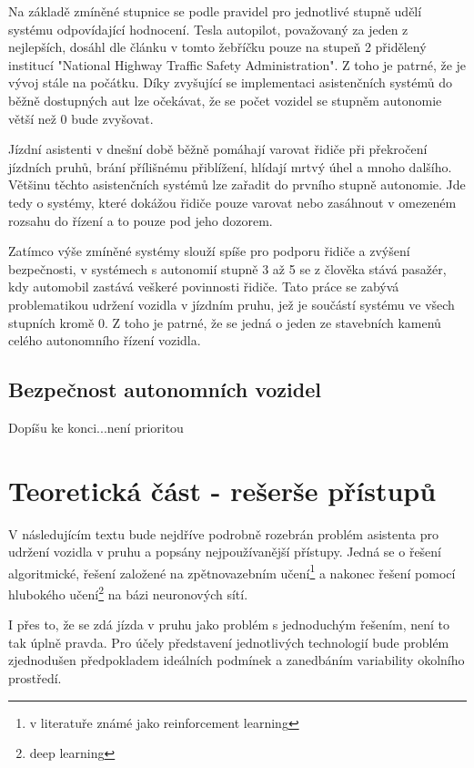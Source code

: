 \documentclass[czech, bc, kky, he, iso690numb]{fasthesis}
\begin{document}
       	Na základě zmíněné stupnice se podle pravidel pro jednotlivé stupně udělí systému odpovídající hodnocení. Tesla autopilot, považovaný za jeden z nejlepších, dosáhl dle článku \cite{autopilot} v tomto žebříčku pouze na stupeň 2 přidělený institucí "National Highway Traffic Safety Administration". Z toho je patrné, že je vývoj stále na počátku. Díky zvyšující se implementaci asistenčních systémů do běžně dostupných aut lze očekávat, že se počet vozidel se stupněm autonomie větší než 0 bude zvyšovat.         
        
        Jízdní asistenti v dnešní době běžně pomáhají varovat řidiče při překročení jízdních pruhů, brání přílišnému přiblížení, hlídají mrtvý úhel a mnoho dalšího. Většinu těchto asistenčních systémů lze zařadit do prvního stupně autonomie. Jde tedy o systémy, které dokážou řidiče pouze varovat nebo zasáhnout v omezeném rozsahu do řízení a to pouze pod jeho dozorem.
        
        Zatímco výše zmíněné systémy slouží spíše pro podporu řidiče a zvýšení bezpečnosti, v systémech s autonomií stupně 3 až 5 se z člověka stává pasažér, kdy automobil zastává veškeré povinnosti řidiče. Tato práce se zabývá problematikou udržení vozidla v jízdním pruhu, jež je součástí systému ve všech stupních kromě 0. Z toho je patrné, že se jedná o jeden ze stavebních kamenů celého autonomního řízení vozidla.\\
    \section{Bezpečnost autonomních vozidel}
    	Dopíšu ke konci...není prioritou
    \chapter{Teoretická část - rešerše přístupů}\label{chap:01_asisten_jizdy_v_pruhu}
	    V následujícím textu bude nejdříve podrobně rozebrán problém asistenta pro udržení vozidla v pruhu a popsány nejpoužívanější přístupy. Jedná se o řešení algoritmické, řešení založené na zpětnovazebním učení\footnote{v literatuře známé jako reinforcement learning} a nakonec řešení pomocí hlubokého učení\footnote{deep learning} na bázi neuronových sítí.
	    
        I přes to, že se zdá jízda v pruhu jako problém s jednoduchým řešením, není to tak úplně pravda. Pro účely představení jednotlivých technologií bude problém zjednodušen předpokladem ideálních podmínek a zanedbáním variability okolního prostředí.
        
\end{document}

